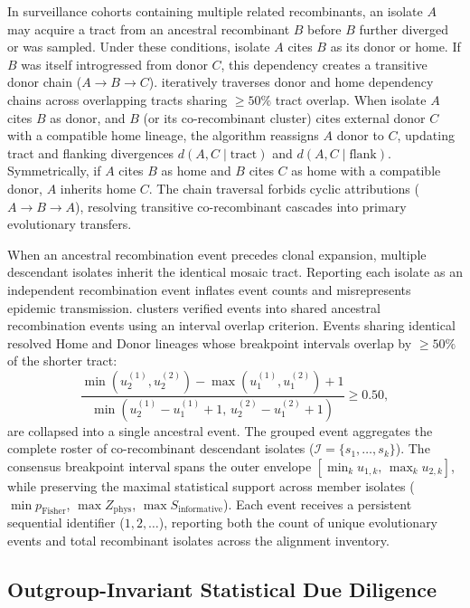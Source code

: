 In surveillance cohorts containing multiple related recombinants, an isolate $A$ may acquire a tract from an ancestral recombinant $B$ before $B$ further diverged or was sampled.
Under these conditions, isolate $A$ cites $B$ as its donor or home.
If $B$ was itself introgressed from donor $C$, this dependency creates a transitive donor chain ($A \to B \to C$).
\RhizAeon iteratively traverses donor and home dependency chains across overlapping tracts sharing $\ge 50\%$ tract overlap.
When isolate $A$ cites $B$ as donor, and $B$ (or its co-recombinant cluster) cites external donor $C$ with a compatible home lineage, the algorithm reassigns $A$ donor to $C$, updating tract and flanking divergences $d(A, C \mid \text{tract})$ and $d(A, C \mid \text{flank})$.
Symmetrically, if $A$ cites $B$ as home and $B$ cites $C$ as home with a compatible donor, $A$ inherits home $C$.
The chain traversal forbids cyclic attributions ($A \to B \to A$), resolving transitive co-recombinant cascades into primary evolutionary transfers.

When an ancestral recombination event precedes clonal expansion, multiple descendant isolates inherit the identical mosaic tract.
Reporting each isolate as an independent recombination event inflates event counts and misrepresents epidemic transmission.
\RhizAeon clusters verified events into shared ancestral recombination events using an interval overlap criterion.
Events sharing identical resolved Home and Donor lineages whose breakpoint intervals overlap by $\ge 50\%$ of the shorter tract:
\begin{equation}
\frac{\min(u_2^{(1)}, u_2^{(2)}) - \max(u_1^{(1)}, u_1^{(2)}) + 1}{\min(u_2^{(1)} - u_1^{(1)} + 1, \, u_2^{(2)} - u_1^{(2)} + 1)} \ge 0.50,
\label{eq:methods_ancestral_overlap}
\end{equation}
are collapsed into a single ancestral event.
The grouped event aggregates the complete roster of co-recombinant descendant isolates ($\mathcal{I} = \{s_1, \dots, s_k\}$).
The consensus breakpoint interval spans the outer envelope $[ \min_k u_{1, k}, \, \max_k u_{2, k} ]$, while preserving the maximal statistical support across member isolates ($\min p_{\text{Fisher}}$, $\max Z_{\text{phys}}$, $\max S_{\text{informative}}$).
Each event receives a persistent sequential identifier ($1, 2, \dots$), reporting both the count of unique evolutionary events and total recombinant isolates across the alignment inventory.

\subsection{Outgroup-Invariant Statistical Due Diligence}
\label{subsec:methods_due_diligence}

